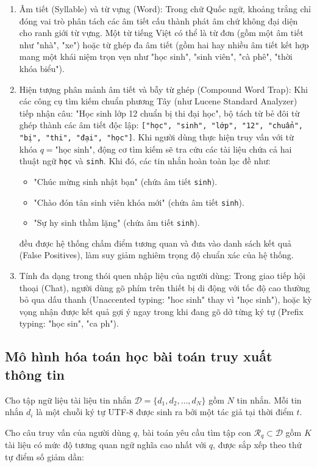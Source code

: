 \documentclass[12pt,a4paper,oneside]{report}
\begin{document}
\begin{enumerate}
    \item Âm tiết (Syllable) và từ vựng (Word): Trong chữ Quốc ngữ, khoảng trắng chỉ đóng vai trò phân tách các âm tiết cấu thành phát âm chứ không đại diện cho ranh giới từ vựng. Một từ tiếng Việt có thể là từ đơn (gồm một âm tiết như "nhà", "xe") hoặc từ ghép đa âm tiết (gồm hai hay nhiều âm tiết kết hợp mang một khái niệm trọn vẹn như "học sinh", "sinh viên", "cà phê", "thời khóa biểu").
    \item Hiện tượng phân mảnh âm tiết và bẫy từ ghép (Compound Word Trap): Khi các công cụ tìm kiếm chuẩn phương Tây (như Lucene Standard Analyzer) tiếp nhận câu: "Học sinh lớp 12 chuẩn bị thi đại học", bộ tách từ bẻ đôi từ ghép thành các âm tiết độc lập: \texttt{["học", "sinh", "lớp", "12", "chuẩn", "bị", "thi", "đại", "học"]}. Khi người dùng thực hiện truy vấn với từ khóa $q = \text{"học sinh"}$, động cơ tìm kiếm sẽ tra cứu các tài liệu chứa cả hai thuật ngữ \texttt{học} và \texttt{sinh}. Khi đó, các tin nhắn hoàn toàn lạc đề như:
    \begin{itemize}
        \item "Chúc mừng sinh nhật bạn" (chứa âm tiết \texttt{sinh}).
        \item "Chào đón tân sinh viên khóa mới" (chứa âm tiết \texttt{sinh}).
        \item "Sự hy sinh thầm lặng" (chứa âm tiết \texttt{sinh}).
    \end{itemize}
    đều được hệ thống chấm điểm tương quan và đưa vào danh sách kết quả (False Positives), làm suy giảm nghiêm trọng độ chuẩn xác của hệ thống.
    \item Tính đa dạng trong thói quen nhập liệu của người dùng: Trong giao tiếp hội thoại (Chat), người dùng gõ phím trên thiết bị di động với tốc độ cao thường bỏ qua dấu thanh (Unaccented typing: "hoc sinh" thay vì "học sinh"), hoặc kỳ vọng nhận được kết quả gợi ý ngay trong khi đang gõ dở từng ký tự (Prefix typing: "học sin", "ca ph").
\end{enumerate}

\subsection{Mô hình hóa toán học bài toán truy xuất thông tin}
Cho tập ngữ liệu tài liệu tin nhắn $\mathcal{D} = \{d_1, d_2, \dots, d_N\}$ gồm $N$ tin nhắn. Mỗi tin nhắn $d_i$ là một chuỗi ký tự UTF-8 được sinh ra bởi một tác giả tại thời điểm $t$.

Cho câu truy vấn của người dùng $q$, bài toán yêu cầu tìm tập con $\mathcal{R}_q \subset \mathcal{D}$ gồm $K$ tài liệu có mức độ tương quan ngữ nghĩa cao nhất với $q$, được sắp xếp theo thứ tự điểm số giảm dần:
\end{document}
